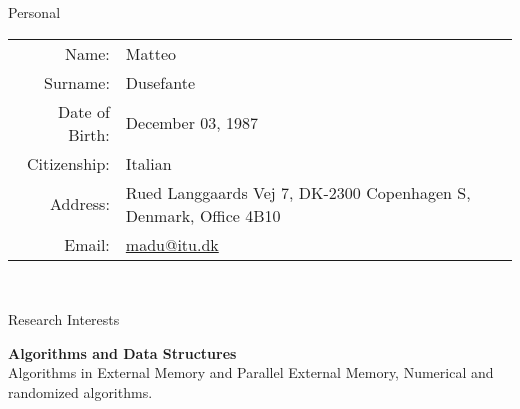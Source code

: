 \documentclass{resume} %
\begin{document}


\begin{rSection}{Personal}

\begin{tabular}{rl}
Name: & Matteo \\
Surname: & Dusefante \\
Date of Birth: & December 03, 1987 \\
Citizenship: & Italian \\
Address: & Rued Langgaards Vej 7, DK-2300 Copenhagen S, Denmark, Office 4B10 \\
Email: & \href{mailto:madu@itu.dk}{madu@itu.dk}
\end{tabular}\\

\end{rSection}


\begin{rSection}{Research Interests}

{\bf Algorithms and Data Structures } \\
Algorithms in External Memory and Parallel External Memory, Numerical and randomized algorithms.\\


\end{rSection}

\end{document}
